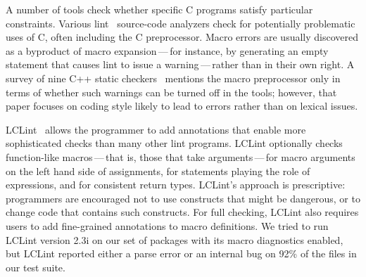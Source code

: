 \documentclass[10pt]{article}
\begin{document}

A number of tools check whether specific C programs satisfy particular
constraints.  Various lint~\cite{Johnson77} source-code analyzers check for
potentially problematic uses of C, often including the C preprocessor.
Macro errors are usually discovered as a byproduct of macro
expansion\,---\,for instance, by generating an empty statement that causes
lint to issue a warning\,---\,rather than in their own right.  A survey of
nine C++ static checkers~\cite{MeyersK97} mentions the macro preprocessor only
in terms of whether such warnings can be turned off in the tools; however,
that paper focuses on coding style likely to lead to errors rather than on
lexical issues.



LCLint~\cite{Evans-fse94,Evans:LCLint} allows the programmer to add
annotations that enable more sophisticated checks than many other lint
programs.  LCLint optionally checks function-like macros\,---\,that is,
those that take arguments\,---\,for macro arguments on the left hand side
of assignments, for statements playing the role of expressions, and for
consistent return types.  LCLint's approach is prescriptive:  programmers
are encouraged not to use constructs that might be dangerous, or to change
code that contains such constructs.  For full checking, LCLint also
requires users to add fine-grained annotations to macro definitions.  We
tried to run LCLint version 2.3i on our set of packages with its macro diagnostics
enabled, but LCLint reported either a parse error or an internal bug on
92\% of the files in our test suite.
\end{document}
